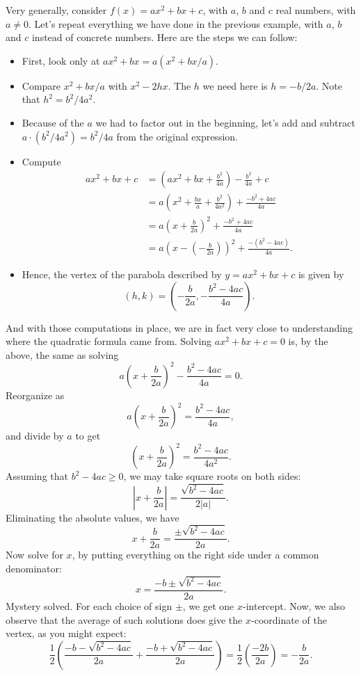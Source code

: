 \documentclass{ximera}
\begin{document}
Very generally, consider $f(x) = ax^2+bx+c$, with $a$, $b$ and $c$ real numbers, with $a \neq 0$. Let's repeat everything we have done in the previous example, with $a$, $b$ and $c$ instead of concrete numbers. Here are the steps we can follow:

\begin{itemize}
\item First, look only at $ax^2 + bx = a(x^2 + bx/a)$.
\item Compare $x^2+bx/a$ with $x^2-2hx$. The $h$ we need here is $h = -b/2a$. Note that $h^2 = b^2/4a^2$.
\item Because of the $a$ we had to factor out in the beginning, let's add and subtract $a \cdot (b^2/4a^2) = b^2/4a$ from the original expression.
\item Compute \begin{align*}  ax^2+bx+c &= \left(ax^2+bx + \frac{b^2}{4a}\right) - \frac{b^2}{4a}+c \\ &= a\left(x^2+\frac{bx}{a} + \frac{b^2}{4a^2}\right) + \frac{-b^2+4ac}{4a} \\ &= a\left(x+\frac{b}{2a}\right)^2+\frac{-b^2+4ac}{4a} \\ &= a\left(x - \left(-\frac{b}{2a}\right)\right)^2 + \frac{-(b^2-4ac)}{4a}. \end{align*}
\item Hence, the vertex of the parabola described by $y=ax^2+bx+c$ is given by $$(h,k) = \left(-\frac{b}{2a}, -\frac{b^2-4ac}{4a}\right).$$
\end{itemize}

And with those computations in place, we are in fact very close to understanding where the quadratic formula came from. Solving $ax^2+bx+c=0$ is, by the above, the same as solving $$a\left(x+\frac{b}{2a}\right)^2 - \frac{b^2-4ac}{4a} = 0.$$Reorganize as $$a\left(x+\frac{b}{2a}\right)^2 = \frac{b^2-4ac}{4a},$$and divide by $a$ to get $$\left(x+\frac{b}{2a}\right)^2 = \frac{b^2-4ac}{4a^2}.$$Assuming that $b^2-4ac \geq 0$, we may take square roots on both sides: $$\left|x+\frac{b}{2a} \right| = \frac{\sqrt{b^2-4ac}}{2|a|}.$$
Eliminating the absolute values, we have $$x+\frac{b}{2a} = \frac{\pm\sqrt{b^2-4ac}}{2a}.$$Now solve for $x$, by putting everything on the right side under a common denominator: $$x = \frac{-b\pm \sqrt{b^2-4ac}}{2a}.$$Mystery solved. For each choice of sign $\pm$, we get one $x$-intercept. Now, we also observe that the average of such solutions does give the $x$-coordinate of the vertex, as you might expect: $$\frac{1}{2}\left(\frac{-b-\sqrt{b^2-4ac}}{2a} + \frac{-b+\sqrt{b^2-4ac}}{2a}\right) = \frac{1}{2} \left(\frac{-2b}{2a}\right) = -\frac{b}{2a}.$$
\end{document}
